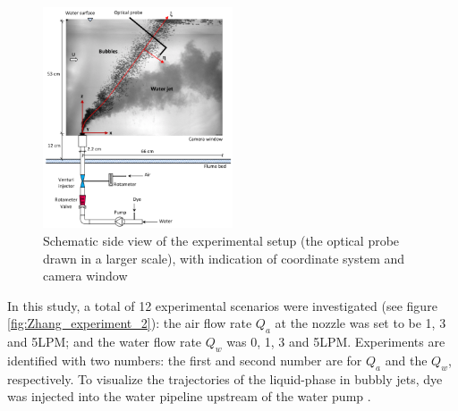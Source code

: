 \begin{figure}[ht!]
    \centering
    \includegraphics[width = 0.5\textwidth]{Images/Zhang_experiment.png}
    \caption{Schematic side view of the experimental setup (the optical probe drawn in a larger scale), with indication of coordinate system and camera window}
    \label{fig:Zhang_experiment}
\end{figure}
\noindent
In this study, a total of 12 experimental scenarios were investigated (see figure \ref{fig:Zhang_experiment_2}): the air flow rate $Q_a$ at the nozzle was set to be 1, 3 and 5LPM; and the water flow rate $Q_w$ was 0, 1, 3 and 5LPM. Experiments are identified with two numbers: the first and second number are for $Q_a$ and the $Q_w$, respectively. To visualize the trajectories of the liquid-phase in bubbly jets, dye was injected into the water pipeline upstream of the water pump \citep{Zhang+}. 


